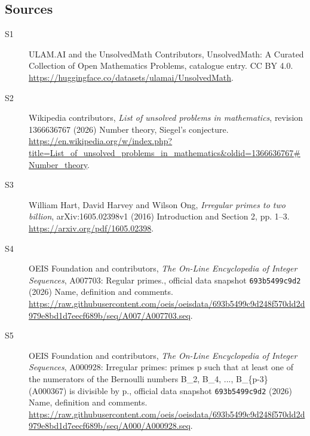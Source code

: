\documentclass[11pt]{article}
\begin{document}
\subsection{Sources}
\begin{description}
\item[\hypertarget{source:statement:1}{S1}] ULAM.AI and the UnsolvedMath Contributors, UnsolvedMath: A Curated Collection of Open Mathematics Problems, catalogue entry. CC BY 4.0. \url{https://huggingface.co/datasets/ulamai/UnsolvedMath}.
\item[\hypertarget{source:statement:2}{S2}] Wikipedia contributors, \emph{List of unsolved problems in mathematics}, revision 1366636767 (2026) Number theory, Siegel's conjecture. \url{https://en.wikipedia.org/w/index.php?title=List_of_unsolved_problems_in_mathematics&oldid=1366636767#Number_theory}.
\item[\hypertarget{source:statement:3}{S3}] William Hart, David Harvey and Wilson Ong, \emph{Irregular primes to two billion}, arXiv:1605.02398v1 (2016) Introduction and Section 2, pp. 1--3. \url{https://arxiv.org/pdf/1605.02398}.
\item[\hypertarget{source:statement:4}{S4}] OEIS Foundation and contributors, \emph{The On-Line Encyclopedia of Integer Sequences}, A007703: Regular primes., official data snapshot \texttt{693b5499c9d2} (2026) Name, definition and comments. \url{https://raw.githubusercontent.com/oeis/oeisdata/693b5499c9d248f570dd2d979e8bd1d7eecf689b/seq/A007/A007703.seq}.
\item[\hypertarget{source:statement:5}{S5}] OEIS Foundation and contributors, \emph{The On-Line Encyclopedia of Integer Sequences}, A000928: Irregular primes: primes p such that at least one of the numerators of the Bernoulli numbers B\_2, B\_4, ..., B\_\{p-3\} (A000367) is divisible by p., official data snapshot \texttt{693b5499c9d2} (2026) Name, definition and comments. \url{https://raw.githubusercontent.com/oeis/oeisdata/693b5499c9d248f570dd2d979e8bd1d7eecf689b/seq/A000/A000928.seq}.
\end{description}
\label{end:statement}
\end{document}
